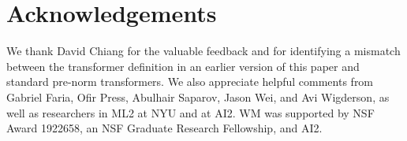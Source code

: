 \documentclass{article} %
\newcommand\change[1]{{\color{blue} #1}}
\renewcommand\change[1]{#1}
\begin{document}

\section*{Acknowledgements}
\change{We thank David Chiang for the valuable feedback and for identifying a mismatch between the transformer definition in an earlier version of this paper and standard pre-norm transformers.}
We also appreciate helpful comments from
Gabriel Faria, Ofir Press, Abulhair Saparov, Jason Wei, and Avi Wigderson,
as well as researchers in ML2 at NYU and at AI2.
WM was supported by NSF Award 1922658, an NSF Graduate Research Fellowship, and AI2.






\appendix

\end{document}
